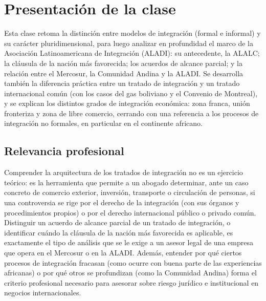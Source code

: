 \documentclass[12pt,oneside]{book}
\begin{document}
\tableofcontents

\chapter*{Presentación de la clase}

Esta clase retoma la distinción entre modelos de integración (formal e informal) y su carácter pluridimensional, para luego analizar en profundidad el marco de la Asociación Latinoamericana de Integración (ALADI): su antecedente, la ALALC; la cláusula de la nación más favorecida; los acuerdos de alcance parcial; y la relación entre el Mercosur, la Comunidad Andina y la ALADI. Se desarrolla también la diferencia práctica entre un tratado de integración y un tratado internacional común (con los casos del gas boliviano y el Convenio de Montreal), y se explican los distintos grados de integración económica: zona franca, unión fronteriza y zona de libre comercio, cerrando con una referencia a los procesos de integración no formales, en particular en el continente africano.

\section*{Relevancia profesional}

Comprender la arquitectura de los tratados de integración no es un ejercicio teórico: es la herramienta que permite a un abogado determinar, ante un caso concreto de comercio exterior, inversión, transporte o circulación de personas, si una controversia se rige por el derecho de la integración (con sus órganos y procedimientos propios) o por el derecho internacional público o privado común. Distinguir un acuerdo de alcance parcial de un tratado de integración, o identificar cuándo la cláusula de la nación más favorecida es aplicable, es exactamente el tipo de análisis que se le exige a un asesor legal de una empresa que opera en el Mercosur o en la ALADI. Además, entender por qué ciertos procesos de integración fracasan (como ocurre con buena parte de las experiencias africanas) o por qué otros se profundizan (como la Comunidad Andina) forma el criterio profesional necesario para asesorar sobre riesgo jurídico e institucional en negocios internacionales.
\end{document}
